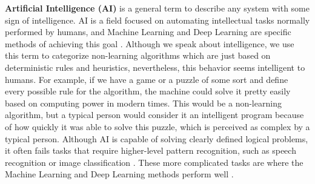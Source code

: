 
\textbf{Artificial Intelligence (AI)} is a general term to describe any system with some sign of intelligence. AI is a field focused on automating intellectual tasks normally performed by humans, and Machine Learning and Deep Learning are specific methods of achieving this goal \cite{AI-ML-DL}. Although we speak about intelligence, we use this term to categorize non-learning algorithms which are just based on deterministic rules and heuristics, nevertheless, this behavior seems intelligent to humans. For example, if we have a game or a puzzle of some sort and define every possible rule for the algorithm, the machine could solve it pretty easily based on computing power in modern times. This would be a non-learning algorithm, but a typical person would consider it an intelligent program because of how quickly it was able to solve this puzzle, which is perceived as complex by a typical person. Although AI is capable of solving clearly defined logical problems, it often fails tasks that require higher-level pattern recognition, such as speech recognition or image classification \cite{AI-ML-DL}. These more complicated tasks are where the Machine Learning and Deep Learning methods perform well \cite{AI-ML-DL}.

